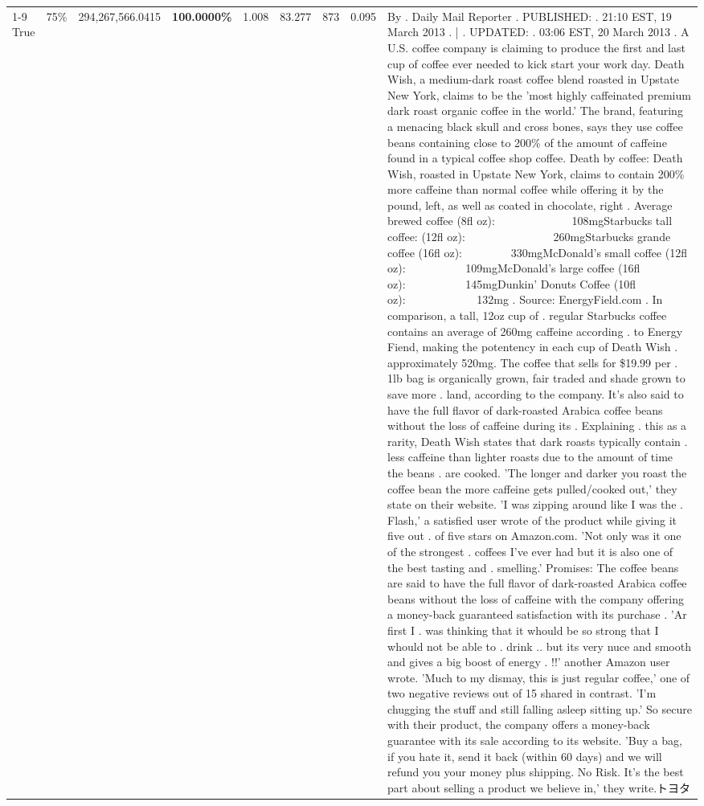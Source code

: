\begin{table}[H]
{\begin{tabular}{lllrlllll}
\cline{1-9} \cline{2-9}
True & 75\% & 294,267,566.0415 & \bfseries \color{red} 100.0000\% & 1.008 & 83.277 & 873 & 0.095 & By . Daily Mail Reporter . PUBLISHED: . 21:10 EST, 19 March 2013 . | . UPDATED: . 03:06 EST, 20 March 2013 . A U.S. coffee company is claiming to produce the first and last cup of coffee ever needed to kick start your work day. Death Wish, a medium-dark roast coffee blend roasted in Upstate New York, claims to be the 'most highly caffeinated premium dark roast organic coffee in the world.' The brand, featuring a menacing black skull and cross bones, says they use coffee beans containing close to 200\% of the amount of caffeine found in a typical coffee shop coffee. Death by coffee: Death Wish, roasted in Upstate New York, claims to contain 200\% more caffeine than normal coffee while offering it by the pound, left, as well as coated in chocolate, right . Average brewed coffee (8fl oz):              108mgStarbucks tall coffee: (12fl oz):                260mgStarbucks grande coffee (16fl oz):         330mgMcDonald's small coffee (12fl oz):           109mgMcDonald's large coffee (16fl oz):           145mgDunkin' Donuts Coffee (10fl oz):             132mg . Source: EnergyField.com . In comparison, a tall, 12oz cup of . regular Starbucks coffee contains an average of 260mg caffeine according . to Energy Fiend, making the potentency in each cup of Death Wish . approximately 520mg. The coffee that sells for \$19.99 per . 1lb bag is organically grown, fair traded and shade grown to save more . land, according to the company. It's also said to have the full flavor of dark-roasted Arabica coffee beans without the loss of caffeine during its . Explaining . this as a rarity, Death Wish states that dark roasts typically contain . less caffeine than lighter roasts due to the amount of time the beans . are cooked. 'The longer and darker you roast the coffee bean the more caffeine gets pulled/cooked out,' they state on their website. 'I was zipping around like I was the . Flash,' a satisfied user wrote of the product while giving it five out . of five stars on Amazon.com. 'Not only was it one of the strongest . coffees I've ever had but it is also one of the best tasting and . smelling.’ Promises: The coffee beans are said to have the full flavor of dark-roasted Arabica coffee beans without the loss of caffeine with the company offering a money-back guaranteed satisfaction with its purchase . 'Ar first I . was thinking that it whould be so strong that I whould not be able to . drink .. but its very nuce and smooth and gives a big boost of energy . !!' another Amazon user wrote. 'Much to my dismay, this is just regular coffee,' one of two negative reviews out of 15 shared in contrast. 'I'm chugging the stuff and still falling asleep sitting up.' So secure with their product, the company offers a money-back guarantee with its sale according to its website. 'Buy a bag, if you hate it, send it back (within 60 days) and we will refund you your money plus shipping. No Risk. It’s the best part about selling a product we believe in,' they write.トヨタ \\

\end{tabular}}
\end{table}
